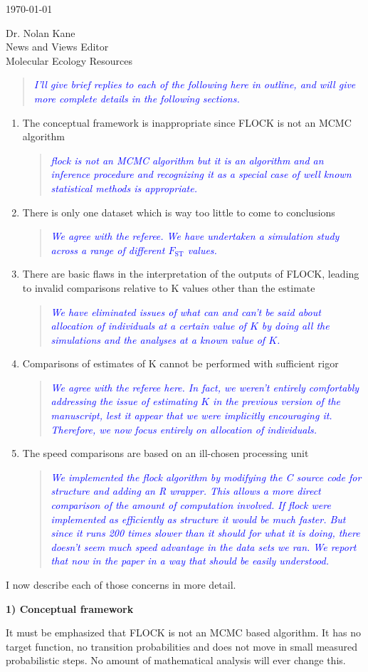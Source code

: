 \documentclass[11pt]{letter}
\newcommand{\reply}[1]{\begin{quotation}\small\sl\textcolor{blue}{#1}\end{quotation}}
\begin{document}
\begin{letter}{ \today 

Dr. Nolan Kane\\
News and Views Editor\\
Molecular Ecology Resources \\
}
\reply{I'll give brief replies to each of the following here in outline,
and will give more complete details in the following sections.}
\begin{enumerate}
\item The conceptual framework is inappropriate since FLOCK is not an MCMC algorithm
\reply{{\sc flock} is not an MCMC algorithm but it {\em is} an algorithm and an inference procedure and 
recognizing it as a special case of well known statistical methods is appropriate.}
\item There is only one dataset which is way too little to come to conclusions
\reply{We agree with the referee. We have undertaken a simulation study across a range of different $F_\mathrm{ST}$ values.}
\item There are basic flaws in the interpretation of the outputs of FLOCK, leading to invalid
comparisons relative to K values other than the estimate
\reply{We have eliminated issues of what can and can't be said about allocation of individuals  at a
certain value of $K$ by doing all the simulations and the analyses at a known value of $K$.}
\item Comparisons of estimates of K cannot be performed with sufficient rigor
\reply{We agree with the referee here.  In fact, we weren't entirely comfortably addressing the issue of estimating
$K$ in the previous version of the manuscript, lest it appear that we were implicitly encouraging it. 
Therefore, we now focus entirely on allocation of individuals.}
\item The speed comparisons are based on an ill-chosen processing unit
\reply{We implemented the {\sc flock} algorithm by modifying the C source code for {\sc structure} and
adding an R wrapper.  This allows a more direct comparison of the amount of computation involved.  If 
{\sc flock} were implemented as efficiently as {\sc structure} it would be much faster.  But since it
runs 200 times slower than it should for what it is doing, there doesn't seem much speed advantage in 
the data sets we ran.  We report that now in the paper in a way that should be easily understood. }
\end{enumerate}

I now describe each of those concerns in more detail.

{\bf 1) Conceptual framework}

It must be emphasized that FLOCK is not an MCMC based algorithm. It has no target function, no transition probabilities and does not move in small measured probabilistic steps. No amount of mathematical analysis will ever change this. 


\end{letter}
\end{document}
